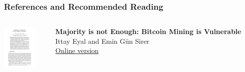 \documentclass[]{beamer}
\begin{document}
\begin{frame}%
\frametitle{References and Recommended Reading}

		\begin{columns}[T]
			\begin{column}{0.1\textwidth}
					\includegraphics[width = 1.7cm, frame]{../assets/images/Mining_cover}
			\end{column} %
			\begin{column}{0.8\textwidth}
				\textbf{Majority is not Enough: Bitcoin Mining is Vulnerable} \\ 
				Ittay Eyal and Emin Gün Sirer \\
				\link \href{https://www.cs.cornell.edu/~ie53/publications/btcProcFC.pdf}{Online version}
			\end{column}
		\end{columns}
	

\end{frame}
\end{document}
